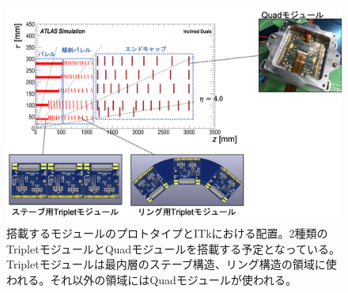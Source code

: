 \begin{figure}[bpt]\centering
\includegraphics[width=12cm]{./module_geom.png}
\caption[搭載するモジュールのプロトタイプとITkにおける配置。]{搭載するモジュールのプロトタイプとITkにおける配置。2種類のTripletモジュールとQuadモジュールを搭載する予定となっている。Tripletモジュールは最内層のステーブ構造、リング構造の領域に使われる。それ以外の領域にはQuadモジュールが使われる。}
\label{module_geom}
\end{figure}


